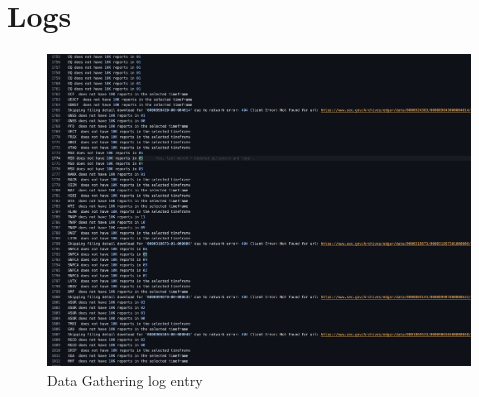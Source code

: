\documentclass[12pt,MSc,a4paper,oneside]{muthesis}
\begin{document}
    \chapter{Logs}
    \label{appendix:12}
    \begin{figure}[h]
      \centering
      \includegraphics[scale=0.3]{results/data_gathering_log.png}
      \caption{Data Gathering log entry }
    \end{figure}
\end{document}
